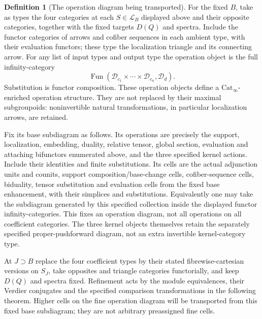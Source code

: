 \documentclass[11pt]{article}
\theoremstyle{definition}
\newtheorem{definition}[theorem]{Definition}
\theoremstyle{remark}
\begin{document}
\begin{definition}[The operation diagram being transported]
\label{def:anchored-operation-diagram}
For the fixed $B$, take as types the four categories at each
$S\in\mathcal L_B$ displayed above and their opposite categories,
together with the fixed targets $D(Q)$ and spectra.  Include the
functor categories of arrows and cofiber sequences in each ambient
type, with their evaluation functors; these type the localization
triangle and its connecting arrow.  For any list of input types and
output type the operation object is the full infinity-category
\[
 \operatorname{Fun}(\mathcal D_{c_1}\times\cdots\times
                         \mathcal D_{c_n},\mathcal D_d).
\]
Substitution is functor composition.  These operation objects define
a $\mathrm{Cat}_\infty$-enriched operation structure.  They are not
replaced by their maximal subgroupoids: noninvertible natural
transformations, in particular localization arrows, are retained.

Fix its base subdiagram as follows.  Its operations are precisely the
support, localization, embedding, duality, relative tensor, global
section, evaluation and attaching bifunctors enumerated above, and
the three specified kernel actions.  Include their identities and
finite substitutions.  Its cells are the actual adjunction units and
counits, support composition/base-change cells, cofiber-sequence cells,
biduality, tensor substitution and evaluation cells from the fixed
base enhancement, with their simplices and substitutions.  Equivalently
one may take the subdiagram generated by this specified collection
inside the displayed functor infinity-categories.  This fixes an
operation diagram, not all operations on all coefficient categories.
The three kernel objects themselves retain the separately specified
proper-pushforward diagram, not an extra invertible kernel-category type.

At $J\supset B$ replace the four coefficient types by their stated
fibrewise-cartesian versions on $S_J$, take opposites and triangle
categories functorially, and keep $D(Q)$ and spectra fixed.  Refinement
acts by the module equivalences, their Verdier conjugates and the
specified comparison transformations in the following theorem.
Higher cells on the fine operation diagram will be transported from
this fixed base subdiagram; they are not arbitrary preassigned fine cells.
\end{definition}
\end{document}

